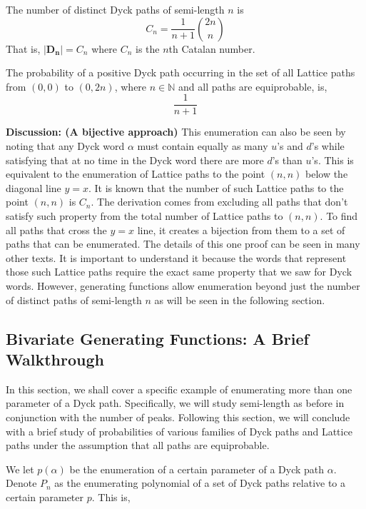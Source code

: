 \documentclass[12pt]{article}
\theoremstyle{definition}
\numberwithin{equation}{section}
\newcommand{\N}{\ensuremath{\mathbb{N}}}
\begin{document}
\result The number of distinct Dyck paths of semi-length $n$ is 
\begin{equation}
    C_n = \frac{1}{n+1}\binom{2n}{n}  
\end{equation}
That is, $|\mathbf{D_n}| = C_n$ where $C_n$ is the $n$th Catalan number.

\result The probability of a positive Dyck path occurring in the set of all Lattice paths from $(0,0)$ to $(0,2n)$, where $n\in\N$ and all paths are equiprobable, is,
\begin{equation}
    \frac{1}{n+1}
\end{equation} \smallskip

\textbf{Discussion: (A bijective approach)} This enumeration can also be seen by noting that any Dyck word $\alpha$ must contain equally as many $u$'s and $d$'s while satisfying that at no time in the Dyck word there are more $d$'s than $u$'s. This is equivalent to the enumeration of Lattice paths to the point $(n, n)$ below the diagonal line $y=x$. It is known that the number of such Lattice paths to the point $(n,n)$ is $C_n$. The derivation comes from excluding all paths that don't satisfy such property from the total number of Lattice paths to $(n,n)$. To find all paths that cross the $y=x$ line, it creates a bijection from them to a set of paths that can be enumerated. The details of this one proof can be seen in many other texts. It is important to understand it because the words that represent those such Lattice paths require the exact same property that we saw for Dyck words. However, generating functions allow enumeration beyond just the number of distinct paths of semi-length $n$ as will be seen in the following section.\smallskip

\newpage

\subsection{Bivariate Generating Functions: A Brief Walkthrough}
In this section, we shall cover a specific example of enumerating more than one parameter of a Dyck path. Specifically, we will study semi-length as before in conjunction with the number of peaks. Following this section, we will conclude with a brief study of probabilities of various families of Dyck paths and Lattice paths under the assumption that all paths are equiprobable.

We let $p(\alpha)$ be the enumeration of a certain parameter of a Dyck path $\alpha$. Denote $P_n$ as the enumerating polynomial of a set of Dyck paths relative to a certain parameter $p$. This is,
\end{document}
